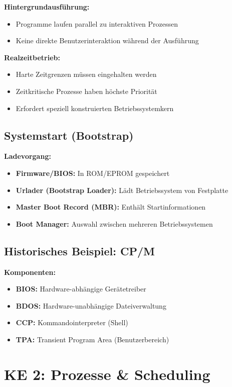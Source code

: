 \documentclass[9pt,a4paper]{extarticle}
\begin{document}
\begin{multicols*}{2}
\textbf{Hintergrundausführung:}
\begin{itemize}
\item Programme laufen parallel zu interaktiven Prozessen
\item Keine direkte Benutzerinteraktion während der Ausführung
\end{itemize}

\textbf{Realzeitbetrieb:}
\begin{itemize}
\item Harte Zeitgrenzen müssen eingehalten werden
\item Zeitkritische Prozesse haben höchste Priorität
\item Erfordert speziell konstruierten Betriebssystemkern
\end{itemize}

\subsection{Systemstart (Bootstrap)}
\textbf{Ladevorgang:}
\begin{itemize}
\item \textbf{Firmware/BIOS:} In ROM/EPROM gespeichert
\item \textbf{Urlader (Bootstrap Loader):} Lädt Betriebssystem von Festplatte
\item \textbf{Master Boot Record (MBR):} Enthält Startinformationen
\item \textbf{Boot Manager:} Auswahl zwischen mehreren Betriebssystemen
\end{itemize}

\subsection{Historisches Beispiel: CP/M}
\textbf{Komponenten:}
\begin{itemize}
\item \textbf{BIOS:} Hardware-abhängige Gerätetreiber
\item \textbf{BDOS:} Hardware-unabhängige Dateiverwaltung
\item \textbf{CCP:} Kommandointerpreter (Shell)
\item \textbf{TPA:} Transient Program Area (Benutzerbereich)
\end{itemize}

\section{KE 2: Prozesse \& Scheduling}


\end{multicols*}
\end{document}
